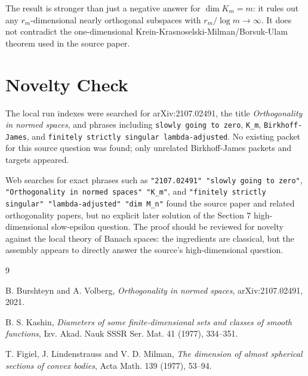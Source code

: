 \documentclass[11pt]{article}
\begin{document}
The result is stronger than just a negative answer for
$\dim K_m=m$: it rules out any $r_m$-dimensional nearly orthogonal subspaces
with $r_m/\log m\to\infty$.  It does not contradict the one-dimensional
Krein-Krasnoselski-Milman/Borsuk-Ulam theorem used in the source paper.

\section*{Novelty Check}

The local run indexes were searched for arXiv:2107.02491, the title
\emph{Orthogonality in normed spaces}, and phrases including
\texttt{slowly going to zero}, \texttt{K\_m}, \texttt{Birkhoff-James}, and
\texttt{finitely strictly singular lambda-adjusted}.  No existing packet for
this source question was found; only unrelated Birkhoff-James packets and
targets appeared.

Web searches for exact phrases such as
\texttt{"2107.02491" "slowly going to zero"},
\texttt{"Orthogonality in normed spaces" "K\_m"}, and
\texttt{"finitely strictly singular" "lambda-adjusted" "dim M\_n"}
found the source paper and related orthogonality papers, but no explicit later
solution of the Section 7 high-dimensional slow-epsilon question.  The proof
should be reviewed for novelty against the local theory of Banach spaces:
the ingredients are classical, but the assembly appears to directly answer
the source's high-dimensional question.

\begin{thebibliography}{9}

B. Burshteyn and A. Volberg,
\emph{Orthogonality in normed spaces},
arXiv:2107.02491, 2021.

B. S. Kashin,
\emph{Diameters of some finite-dimensional sets and classes of smooth
functions},
Izv. Akad. Nauk SSSR Ser. Mat. 41 (1977), 334--351.

T. Figiel, J. Lindenstrauss and V. D. Milman,
\emph{The dimension of almost spherical sections of convex bodies},
Acta Math. 139 (1977), 53--94.

\end{thebibliography}
\end{document}
